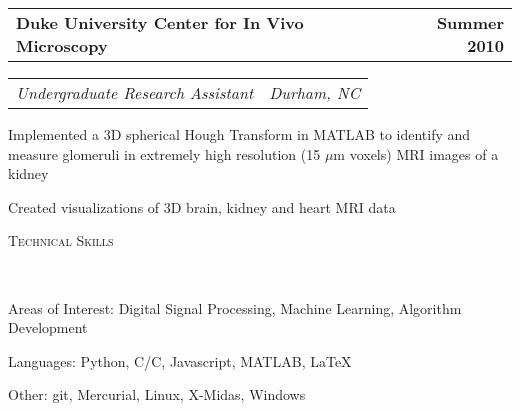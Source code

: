\documentclass[10pt]{article}
\makeatletter
\newenvironment{changemargin}[2]{%
  \begin{list}{}{%
    \setlength{\topsep}{0pt}%
    \setlength{\leftmargin}{#1}%
    \setlength{\rightmargin}{#2}%
    \setlength{\listparindent}{\parindent}%
    \setlength{\itemindent}{\parindent}%
    \setlength{\parsep}{\parskip}%
  }%
  \item[]}{\end{list}
}
\newcommand{\lineover}{
	\begin{changemargin}{-0.05in}{-0.05in}
		\vspace*{-8pt}
		\hrulefill \\
		\vspace*{-2pt}
	\end{changemargin}
}
\newenvironment{body} {
	\begin{changemargin}{-0.25in}{-0.5in}
  }
	{\end{changemargin}
}
\newcommand{\headerrule}[1]{
    \vspace*{5pt}
    \begin{changemargin}{-0.5in}{-0.5in}
        \scshape{#1}\\
    \lineover
    \end{changemargin}
}
\newcommand{\headerrow}[2]
{\begin{tabular*}{\linewidth}{@{}l@{\extracolsep{\fill}}r}
	#1 &
	#2 \\
\end{tabular*}}
\newcommand{\CPP}
{C\nolinebreak[4]\hspace{-.05em}\raisebox{.22ex}{\footnotesize\bf ++ }}
\makeatother
\begin{document}
\begin{body}

    \vspace{+0.5em}
    \headerrow
        {\textbf{Duke University Center for In Vivo Microscopy}}
        {\textbf{Summer 2010}}
    \headerrow
        {\emph{Undergraduate Research Assistant}}
        {\emph{Durham, NC}}
    \begin{itemize*}
        \item Implemented a 3D spherical Hough Transform in MATLAB to identify
              and measure glomeruli in extremely high resolution (15
              $\mu$m voxels) MRI images of a kidney
        \item Created visualizations of 3D brain, kidney and heart MRI data
    \end{itemize*}
\end{body}
\headerrule{Technical Skills}
\begin{body}
\begin{description*}
	\item[Areas of Interest:]
	Digital Signal Processing, Machine Learning, Algorithm Development
	\item[Languages:]
	Python, C/\CPP, Javascript, MATLAB, \LaTeX
	\item[Other:]
    git, Mercurial, Linux, X-Midas, Windows
\end{description*}
\end{body}
\end{document}
